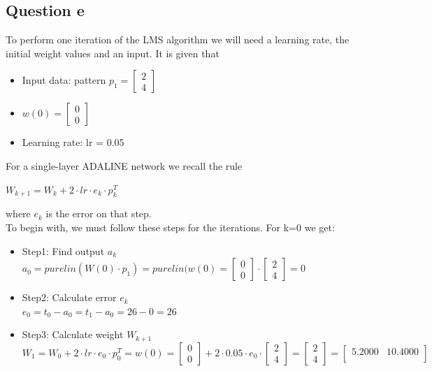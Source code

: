 \subsection{Question e}
To perform one iteration of the LMS algorithm we will need a learning rate, the initial weight values and an input. It is given that
\begin{itemize}
	\item Input data: pattern $p_1 = \left[
	\begin{array}{c}
		2 \\
		4
	\end{array}
	\right]
	$
	\item $w(0) = \left[
	\begin{array}{c}
		0 \\
		0
	\end{array}
	\right]
	$
	\item Learning rate: lr = 0.05
\end{itemize}
For a single-layer ADALINE network we recall the rule
\begin{center}
	$W_{k+1} = W_k + 2 \cdot lr \cdot e_k \cdot p_k^T$
\end{center}
where $e_k$ is the error on that step.\\

To begin with, we must follow these steps for the iterations. For k=0 we get:
\begin{itemize}
	\item Step1: Find output $a_k$\\
	$a_0 = purelin(W(0) \cdot p_1) = purelin(w(0) = \left[
	\begin{array}{c}
		0 \\
		0
	\end{array}
	\right] \cdot \left[\begin{array}{c}
		2 \\
		4
	\end{array}
	\right] = 0 $
	\item Step2: Calculate error $e_k$\\
	$e_0 = t_0 - a_0 = t_1 - a_0 = 26 - 0 = 26$
	\item Step3: Calculate weight $W_{k+1}$\\
	$W_{1} = W_0 + 2 \cdot lr \cdot e_0 \cdot p_0^T = w(0) = \left[
	\begin{array}{c}
		0 \\
		0
	\end{array}
	\right] + 2 \cdot 0.05 \cdot e_0 \cdot  \left[
	\begin{array}{c}
		2 \\
		4
	\end{array}
	\right] =  \left[
	\begin{array}{c}
		2 \\
		4
	\end{array}
	\right] =  \left[
	\begin{array}{cc}
		5.2000 & 10.4000 \\
	\end{array}
	\right]$
	
\end{itemize}







	

